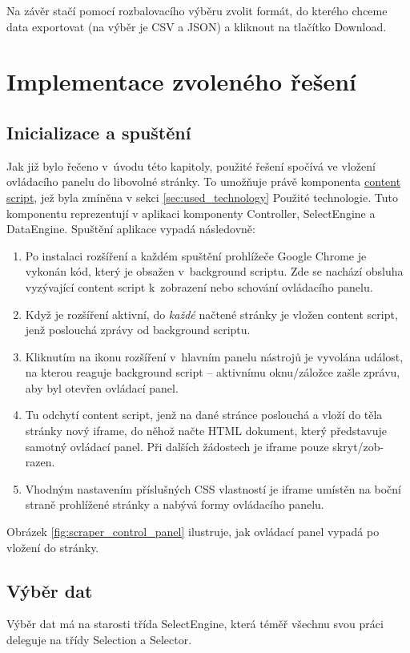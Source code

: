 \documentclass[thesis=B,czech]{FITthesis}[2012/06/26]
\begin{document}
Na závěr stačí pomocí rozbalovacího výběru zvolit formát, do kterého chceme data exportovat (na výběr je CSV a JSON) a kliknout na tlačítko \textsf{Download}.


\section{Implementace zvoleného řešení}

\subsection{Inicializace a spuštění}
Jak již bylo řečeno v~úvodu této kapitoly, použité řešení spočívá ve vložení ovládacího panelu do libovolné stránky. To umožňuje právě komponenta \hyperref[def:content_script]{content script}, jež byla zmíněna v sekci \ref{sec:used_technology} Použité technologie. Tuto komponentu reprezentují v aplikaci komponenty Controller, SelectEngine a DataEngine. Spuštění aplikace vypadá následovně:
\begin{enumerate}
	\item Po instalaci rozšíření a každém spuštění prohlížeče Google Chrome je vykonán kód, který je obsažen v~background scriptu. Zde se nachází obsluha vyzývající content script k~zobrazení nebo schování ovládacího panelu.
	\item Když je rozšíření aktivní, do \emph{každé} načtené stránky je vložen content script, jenž poslouchá zprávy od background scriptu.
	\item Kliknutím na ikonu rozšíření v~hlavním panelu nástrojů je vyvolána událost, na kterou reaguje background script -- aktivnímu oknu/záložce zašle zprávu, aby byl otevřen ovládací panel. 
	\item Tu odchytí content script, jenž na dané stránce poslouchá a vloží do těla stránky nový iframe, do něhož načte HTML dokument, který představuje samotný ovládací panel. Při dalších žádostech je iframe pouze skryt/zob-razen.
	\item Vhodným nastavením příslušných CSS vlastností je iframe umístěn na boční straně prohlížené stránky a nabývá formy ovládacího panelu. 
\end{enumerate}
Obrázek \ref{fig:scraper_control_panel} ilustruje, jak ovládací panel vypadá po vložení do stránky.

\subsection{Výběr dat}
\label{sec:data_selection}
Výběr dat má na starosti třída SelectEngine, která téměř všechnu svou práci deleguje na třídy Selection a Selector. 
\end{document}
